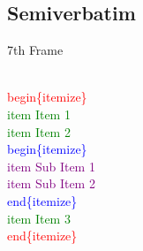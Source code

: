 \documentclass[12pt, aspectratio=169, xcolor={table}]{beamer}
\begin{document}
	\subsection{Semiverbatim}
	\begin{frame}[fragile]{7th Frame}
		\begin{semiverbatim}
			\textcolor{red}{\\begin\{itemize\}}
				\textcolor{green}{\\item Item 1}
				\textcolor{green}{\\item Item 2}
					\textcolor{blue}{\\begin\{itemize\}}
						\textcolor{purple}{\\item Sub Item 1}
						\textcolor{purple}{\\item Sub Item 2}
					\textcolor{blue}{\\end\{itemize\}}
				\textcolor{green}{\\item Item 3}
			\textcolor{red}{\\end\{itemize\}}
		\end{semiverbatim}
	\end{frame}
\end{document}
